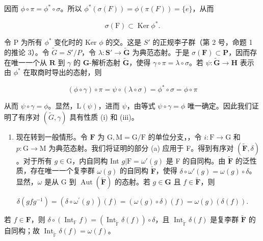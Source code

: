 因而 \(\phi \circ \pi = \phi^{*} \circ \sigma\)。所以 \(\phi^{*}(\sigma(F)) = \phi(\pi(F)) = \{e\}\)，从而

\[
\sigma (\mathrm{F}) \subset \operatorname{Ker} \phi^ {*}.
\]

令 P 为所有 \(\phi^{*}\) 变化时的 Ker \(\phi\) 的交。这是 \(S'\) 的正规李子群（第 2 号，命题 1 的推论 3）。令 \(\tilde{G} = S'/P\)，令 \(\lambda: \mathbf{S}' \to \tilde{\mathbf{G}}\) 为典范态射。于是 \(\sigma(\mathbf{F}) \subset \mathbf{P}\)，因而存在唯一一个从 \(\mathbf{R}\) 到 \(\gamma\) 的 \(\mathbf{G}\)-解析态射 \(\tilde{\mathbf{G}}\)，使得 \(\gamma \circ \pi = \lambda \circ \sigma\)。若 \(\psi: \tilde{\mathbf{G}} \to \mathbf{H}\) 表示由 \(\phi^*\) 在取商时导出的态射，则

\[
(\phi \circ \gamma) \circ \pi = \psi \circ (\lambda \circ \sigma) = \phi^ {*} \circ \sigma = \phi \circ \pi
\]

从而 \(\psi \circ \gamma = \phi\)。显然，\(\mathrm{L}(\psi)\)，进而 \(\psi\)，由等式 \(\psi \circ \gamma = \phi\) 唯一确定。因此我们证明了有序对 \((\tilde{G}, \gamma)\) 具有性质 (i) 和 (iii)。

\begin{enumerate}
\def\labelenumi{(\alph{enumi})}
\setcounter{enumi}{1}
\tightlist
\item
  现在转到一般情形。令 \(\mathbf{F}\) 为 \(\mathrm{G},\mathrm{M} = \mathrm{G} / \mathrm{F}\) 的单位分支，，令 \(i\colon \mathrm{F}\to \mathrm{G}\) 和 \(p\colon \mathrm{G}\rightarrow \mathrm{M}\) 为典范态射。我们将证明的部分 (a) 应用于 F。得到有序对 \((\tilde{\mathbf{F}},\delta)\)。对于所有 \(g\in \mathrm{G}\)，内自同构 Int \(g|\mathrm{F} = \omega '(g)\) 是 F 的自同构。由 \(\tilde{\mathbf{F}}\) 的泛性质，存在唯一一个复李群 \(\omega (g)\) 的自同构 \(\tilde{\mathbf{F}}\)，使得 \(\delta \circ \omega '(g) = \omega (g)\circ \delta\)。显然，\(\omega\) 是从 G 到 \(\operatorname {Aut}(\tilde{\mathbf{F}})\) 的态射。若 \(g\in \mathbf{G}\) 且 \(f\in \tilde{\mathbf{F}}\)，则
\end{enumerate}

\[
\delta (g f g ^ {- 1}) = (\delta \circ \omega^ {\prime} (g)) (f) = (\omega (g) \circ \delta) (f) = \omega (g) (\delta (f)).
\]

若 \(f \in \mathbf{F}\)，则 \(\delta \circ (\operatorname{Int}_{\mathbb{F}} f) = (\operatorname{Int}_{\tilde{\mathbb{F}}} \delta(f)) \circ \delta\)，且 \(\operatorname{Int}_{\tilde{\mathbb{F}}} \delta(f)\) 是复李群 \(\tilde{\mathbf{F}}\) 的自同构；故 \(\operatorname{Int}_{\tilde{\mathbb{F}}} \delta(f) = \omega(f)\)。

